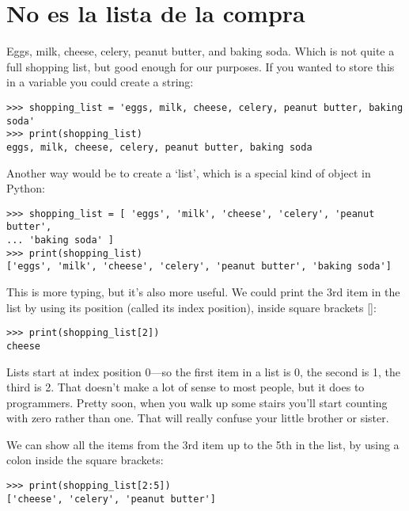 \section{No es la lista de la compra}

Eggs, milk, cheese, celery, peanut butter, and baking soda.  Which is not quite a full shopping list, but good enough for our purposes. If you wanted to store this in a variable you could create a string:

\begin{listing}
\begin{verbatim}
>>> shopping_list = 'eggs, milk, cheese, celery, peanut butter, baking soda'
>>> print(shopping_list)
eggs, milk, cheese, celery, peanut butter, baking soda
\end{verbatim}
\end{listing}

Another way would be to create a `list', which is a special kind of object in Python:

\begin{listing}
\begin{verbatim}
>>> shopping_list = [ 'eggs', 'milk', 'cheese', 'celery', 'peanut butter', 
... 'baking soda' ]
>>> print(shopping_list)
['eggs', 'milk', 'cheese', 'celery', 'peanut butter', 'baking soda']
\end{verbatim}
\end{listing}

This is more typing, but it's also more useful.  We could print the 3rd item in the list by using its position (called its index position), inside square brackets []:

\begin{listing}
\begin{verbatim}
>>> print(shopping_list[2])
cheese
\end{verbatim}
\end{listing}

Lists start at index position 0---so the first item in a list is 0, the second is 1, the third is 2.  That doesn't make a lot of sense to most people, but it does to programmers.  Pretty soon, when you walk up some stairs you'll start counting with zero rather than one.  That will really confuse your little brother or sister.
\par
We can show all the items from the 3rd item up to the 5th in the list, by using a colon inside the square brackets:

\begin{listing}
\begin{verbatim}
>>> print(shopping_list[2:5])
['cheese', 'celery', 'peanut butter']
\end{verbatim}
\end{listing}

